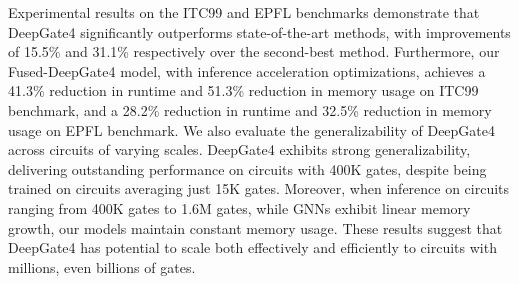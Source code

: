 Experimental results on the ITC99 and EPFL benchmarks demonstrate that DeepGate4 significantly outperforms state-of-the-art methods, with improvements of 15.5\% and 31.1\% respectively over the second-best method. Furthermore, our Fused-DeepGate4 model, with inference acceleration optimizations, achieves a 41.3\% reduction in runtime and 51.3\% reduction in memory usage on ITC99 benchmark, and a 28.2\% reduction in runtime and 32.5\% reduction in memory usage on EPFL benchmark.
We also evaluate the generalizability of DeepGate4 across circuits of varying scales. DeepGate4 exhibits strong generalizability, delivering outstanding performance on circuits with 400K gates, despite being trained on circuits averaging just 15K gates. Moreover, when inference on circuits ranging from 400K gates to 1.6M gates, while GNNs exhibit linear memory growth, our models maintain constant memory usage. These results suggest that DeepGate4 has potential to scale both effectively and efficiently to circuits with millions, even billions of gates.

\vspace{-10pt}